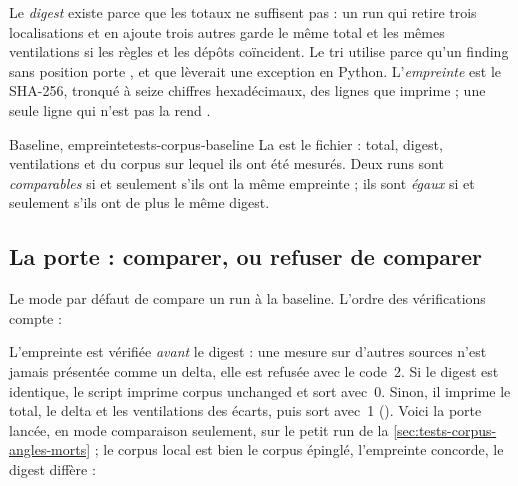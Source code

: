 
Le \emph{digest} existe parce que les totaux ne suffisent pas : un run qui retire trois localisations et en ajoute trois autres garde le même total et les mêmes ventilations si les règles et les dépôts coïncident. Le tri utilise  parce qu'un finding sans position porte , et que  lèverait une exception en Python. L'\emph{empreinte} est le SHA-256, tronqué à seize chiffres hexadécimaux, des lignes que  imprime ; une seule ligne qui n'est pas  la rend .

\begin{definition}{Baseline, empreinte}{tests-corpus-baseline}
La  est le fichier  : total, digest, ventilations et  du corpus sur lequel ils ont été mesurés. Deux runs sont \emph{comparables} si et seulement s'ils ont la même empreinte ; ils sont \emph{égaux} si et seulement s'ils ont de plus le même digest.
\end{definition}

\subsection{La porte : comparer, ou refuser de comparer}

Le mode par défaut de  compare un run à la baseline. L'ordre des vérifications compte :


L'empreinte est vérifiée \emph{avant} le digest : une mesure sur d'autres sources n'est jamais présentée comme un delta, elle est refusée avec le code~2. Si le digest est identique, le script imprime \og corpus unchanged\fg{} et sort avec~0. Sinon, il imprime le total, le delta et les ventilations des écarts, puis sort avec~1 (). Voici la porte lancée, en mode comparaison seulement, sur le petit run  de la \cref{sec:tests-corpus-angles-morts} ; le corpus local est bien le corpus épinglé, l'empreinte concorde, le digest diffère :

